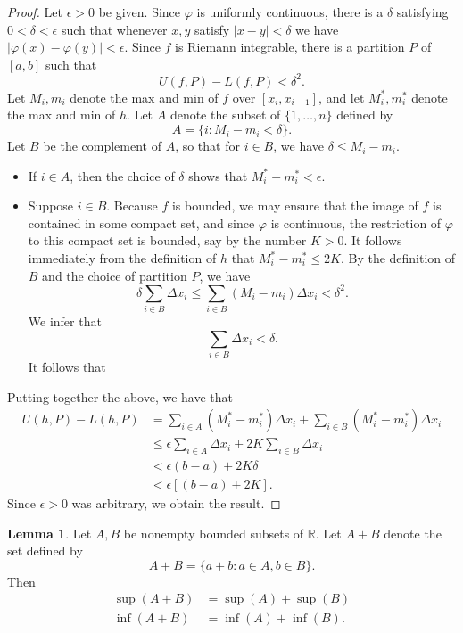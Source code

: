 \documentclass[12pt]{article}
\theoremstyle{definition}
\theoremstyle{theorem}
\newtheorem{lemma}[definition]{Lemma}
\begin{document}
\begin{proof}
Let $\epsilon > 0$ be given. Since $\varphi$ is uniformly continuous, there is a $\delta$ satisfying $0 < \delta < \epsilon$ such that whenever $x,y$ satisfy $|x-y| < \delta$ we have $|\varphi(x) - \varphi(y)| < \epsilon.$ Since $f$ is Riemann integrable, there is a partition $P$ of $[a,b]$ such that 
\[
U(f,P) - L(f,P) < \delta^2.
\]
Let $M_i, m_i$ denote the max and min of $f$ over $[x_i, x_{i-1}]$, and let $M_i^*, m_i^*$ denote the max and min of $h$. Let $A$ denote the subset of $\{1, \ldots, n\}$ defined by 
\[
A = \{i : M_i - m_i < \delta\}.
\]
Let $B$ be the complement of $A$, so that for $i \in B$, we have $\delta \leqslant M_i - m_i$.  
\begin{itemize}
\item If $i \in A$, then the choice of $\delta$ shows that $M_i^* - m_i^* < \epsilon$.
\item Suppose $i \in B$. Because $f$ is bounded, we may ensure that the image of $f$ is contained in some compact set, and since $\varphi$ is continuous, the restriction of $\varphi$ to this compact set is bounded, say by the number $K > 0$. It follows immediately from the definition of $h$ that $M_i^* - m_i^* \leqslant 2K$. By the definition of $B$ and the choice of partition $P$, we have 
\[
\delta \sum_{i \in B} \Delta x_i \leqslant \sum_{i \in B} (M_i - m_i)\Delta x_i < \delta^2. 
\]
We infer that 
\[
\sum_{i \in B}\Delta x_i < \delta. 
\]
It follows that 
\end{itemize}
Putting together the above, we have that 
\begin{align*}
U(h,P) - L(h,P) &= \sum_{i \in A}(M_i^* - m_i^*)\Delta x_i  + \sum_{i \in B}(M_i^* - m_i^*)\Delta x_i \\
&\leqslant \epsilon \sum_{i \in A}\Delta x_i + 2K \sum_{i \in B} \Delta x_i \\
&< \epsilon(b- a) + 2K \delta \\
&< \epsilon[(b-a) + 2K].
\end{align*}
Since $\epsilon > 0$ was arbitrary, we obtain the result. 
\end{proof}



\begin{lemma}
Let $A,B$ be nonempty bounded subsets of $\mathbb{R}$. Let $A + B$ denote the set defined by 
\[
A + B = \{a + b : a \in A, b \in B\}.
\]
Then 
\begin{align*}
\sup(A+B) &= \sup(A) + \sup(B) \\
\inf(A+B) &= \inf(A) + \inf(B).
\end{align*}
\end{lemma}
\end{document}
